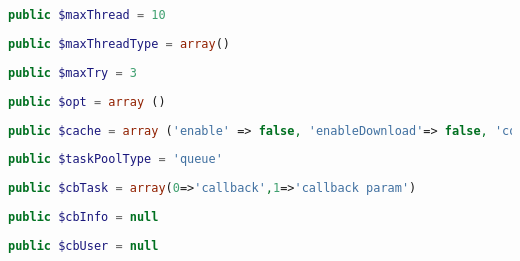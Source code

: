 \begin{lstlisting}[language=PHP]
public $maxThread = 10
\end{lstlisting}





\begin{lstlisting}[language=PHP]
public $maxThreadType = array()
\end{lstlisting}






\begin{lstlisting}[language=PHP]
public $maxTry = 3
\end{lstlisting}




\begin{lstlisting}[language=PHP]
public $opt = array ()
\end{lstlisting}




\begin{lstlisting}[language=PHP]
public $cache = array ('enable' => false, 'enableDownload'=> false, 'compress' => false, 'dir' => null, 'expire' =>86400, 'dirLevel' => 1, 'verifyPost' => false, 'overwrite' => false, 'overwriteExpire' => 86400)
\end{lstlisting}





\begin{lstlisting}[language=PHP]
public $taskPoolType = 'queue'
\end{lstlisting}




\begin{lstlisting}[language=PHP]
public $cbTask = array(0=>'callback',1=>'callback param')
\end{lstlisting}






\begin{lstlisting}[language=PHP]
public $cbInfo = null
\end{lstlisting}




\begin{lstlisting}[language=PHP]
public $cbUser = null
\end{lstlisting}







